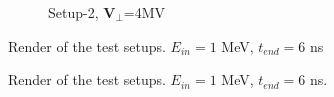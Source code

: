 \documentclass[a4paper,oneside,12pt]{report}
\numberwithin{equation}{chapter}
\begin{document}
{\begin{figure}[H]
\begin{subfigure}{0.9\textwidth}
        \caption*{Setup-2, $\textbf{V}_{\perp}$=4MV}
    \end{subfigure}
    \caption{Render of the test setups.  $E_{in}=1$ MeV, $t_{end}=6$ ns}
\end{figure} \fi
\begin{figure}[H]
    \centering
    \vspace{15pt}
    \vspace{15pt}
    \caption{Render of the test setups.  $E_{in}=1$ MeV, $t_{end}=6$ ns.}
\end{figure}

}
\end{document}

